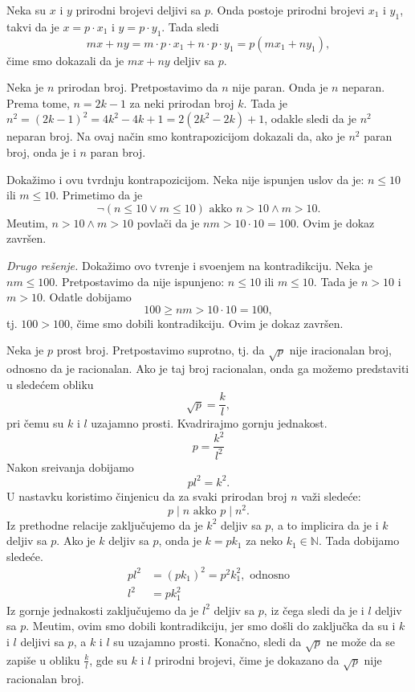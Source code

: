 Neka su $x$ i $y$ prirodni brojevi deljivi sa $p$. Onda postoje prirodni brojevi $x_1$ i $y_1$, takvi da je $x=p\cdot x_1$ i $y=p\cdot y_1$. Tada sledi
\[mx+ny=m\cdot p\cdot x_1+n\cdot p\cdot y_1=p(mx_1+ny_1),\]
\v cime smo dokazali da je $mx+ny$ deljiv sa $p$.

Neka je $n$ prirodan broj. Pretpostavimo da $n$ nije paran. Onda je $n$ neparan. Prema tome, $n=2k-1$ za neki prirodan broj $k$. Tada je $n^2=(2k-1)^2=4k^2-4k+1=2(2k^2-2k)+1$, odakle sledi da je $n^2$ neparan broj. Na ovaj na\v cin smo kontrapozicijom dokazali da, ako je $n^2$ paran broj, onda je i $n$ paran broj.

 Doka\v zimo i ovu tvrdnju kontrapozicijom. Neka nije ispunjen uslov da je: $n\leq 10$ ili $m\leq 10$. Primetimo da je
\[\neg(n\leq 10\vee m\leq 10)\text{ akko }n>10\wedge m> 10.\]
Me\dj utim, $n>10\wedge m> 10$ povla\v ci da je $nm>10\cdot 10=100$. Ovim je dokaz zavr\v sen.

{\it Drugo re\v senje.} Doka\v zimo ovo tvr\dj enje i svo\dj enjem na kontradikciju. Neka je $nm\leq 100$. Pretpostavimo da nije ispunjeno: $n\leq 10$ ili $m\leq 10$. Tada je $n>10$ i $m>10$. Odatle dobijamo
\[100\geq nm>10\cdot 10=100,\]
tj. $100>100$, \v cime smo dobili kontradikciju. Ovim je dokaz zavr\v sen.

Neka je $p$ prost broj. Pretpostavimo suprotno, tj. da $\sqrt p$ nije iracionalan broj, odnosno da je racionalan. Ako je taj broj racionalan, onda ga mo\v zemo predstaviti u slede\' cem obliku
\[\sqrt p=\frac kl,\]
pri \v cemu su $k$ i $l$ uzajamno prosti. Kvadrirajmo gornju jednakost.
\[p=\frac{k^2}{l^2}\]
Nakon sre\dj ivanja dobijamo
\[pl^2=k^2.\]
U nastavku koristimo \v cinjenicu da za svaki prirodan broj $n$ va\v zi slede\' ce:
\[p\mid n\text{ akko }p\mid n^2.\]
Iz prethodne relacije zaklju\v cujemo da je $k^2$ deljiv sa $p$, a to implicira da je i $k$ deljiv sa $p$. Ako je $k$ deljiv sa $p$, onda je $k=pk_1$ za neko $k_1\in\mathbb N$. Tada dobijamo slede\' ce.
\begin{align*}
pl^2&=(pk_1)^2=p^2k_1^2, \text{ odnosno}\\
l^2&=pk_1^2
\end{align*}
Iz gornje jednakosti zaklju\v cujemo da je $l^2$ deljiv sa $p$, iz \v cega sledi da je i $l$ deljiv sa $p$. Me\dj utim, ovim smo dobili kontradikciju, jer smo do\v sli do zaklju\v cka da su i $k$ i $l$ deljivi sa $p$, a $k$ i $l$ su uzajamno prosti. Kona\v cno, sledi da $\sqrt p$ ne mo\v ze da se zapi\v se u obliku $\frac kl$, gde su $k$ i $l$ prirodni brojevi, \v cime je dokazano da $\sqrt p$ nije racionalan broj.

